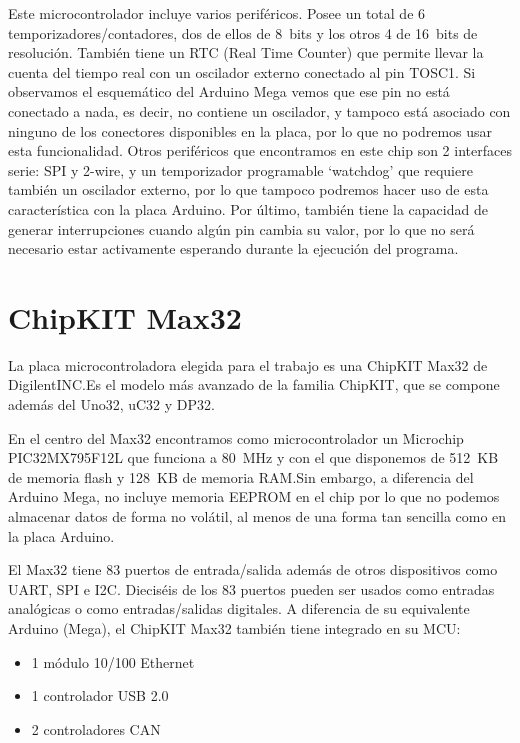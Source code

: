 Este microcontrolador incluye varios periféricos. Posee un total de 6 temporizadores/contadores, dos de ellos de 8~bits y los otros 4 de 16~bits de resolución. También tiene un RTC (Real Time Counter) que permite llevar la cuenta del tiempo real con un oscilador externo conectado al pin TOSC1. Si observamos el esquemático del Arduino Mega vemos que ese pin no está conectado a nada, es decir, no contiene un oscilador, y tampoco está asociado con ninguno de los conectores disponibles en la placa, por lo que no podremos usar esta funcionalidad. Otros periféricos que encontramos en este chip son 2 interfaces serie: SPI y 2-wire, y un temporizador programable `watchdog' que requiere también un oscilador externo, por lo que tampoco podremos hacer uso de esta característica con la placa Arduino. Por último, también tiene la capacidad de generar interrupciones cuando algún pin cambia su valor, por lo que no será necesario estar activamente esperando durante la ejecución del programa.

\section{ChipKIT Max32}
La placa microcontroladora elegida para el trabajo es una ChipKIT Max32 de DigilentINC.\@ Es el modelo más avanzado de la familia ChipKIT, que se compone además del Uno32, uC32 y DP32.


En el centro del Max32 encontramos como microcontrolador un Microchip PIC32MX795F12L que funciona a 80~MHz y con el que disponemos de 512~KB de memoria flash y 128~KB de memoria RAM.\@ Sin embargo, a diferencia del Arduino Mega, no incluye memoria EEPROM en el chip por lo que no podemos almacenar datos de forma no volátil, al menos de una forma tan sencilla como en la placa Arduino. 

El Max32 tiene 83 puertos de entrada/salida además de otros dispositivos como UART, SPI e I2C. Dieciséis de los 83 puertos pueden ser usados como entradas analógicas o como entradas/salidas digitales. A diferencia de su equivalente Arduino (Mega), el ChipKIT Max32 también tiene integrado en su MCU:
\begin{itemize}
 \item 1 módulo 10/100 Ethernet
 \item 1 controlador USB 2.0
 \item 2 controladores CAN 
 \end{itemize} 
 
